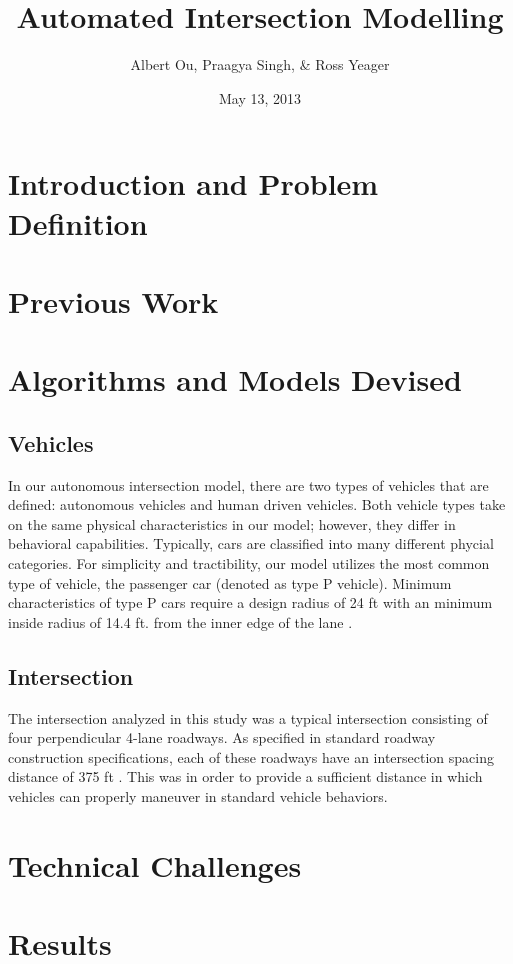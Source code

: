 \documentclass[10pt]{article}
\title{Automated Intersection Modelling}
\author{Albert Ou, Praagya Singh, & Ross Yeager}
\date{May 13, 2013}
\begin{document}
\maketitle
\section{Introduction and Problem Definition}

\section{Previous Work}

\section{Algorithms and Models Devised}

\subsection{Vehicles}
In our autonomous intersection model, there are two types of vehicles that are defined: autonomous vehicles and human driven vehicles.  
Both vehicle types take on the same physical characteristics in our model; however, they differ in behavioral capabilities.  
Typically, cars are classified into many different phycial categories.  
For simplicity and tractibility, our model utilizes the most common type of vehicle, the passenger car (denoted as type P vehicle).  
Minimum characteristics of type P cars require a design radius of 24 ft with an minimum inside radius of 14.4 ft. from the inner edge of the lane .


\subsection{Intersection}
The intersection analyzed in this study was a typical intersection consisting of four perpendicular 4-lane roadways.   As specified in standard roadway construction specifications, each of these roadways have an intersection spacing distance of 375 ft .
This was in order to provide a sufficient distance in which vehicles can properly maneuver in standard vehicle behaviors. 

\section{Technical Challenges}

\section{Results}
\end{document}
